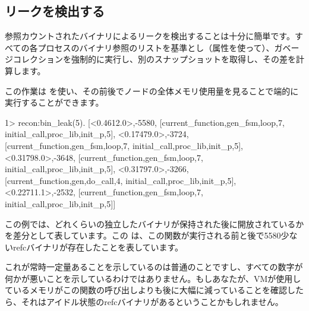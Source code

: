 \subsection{リークを検出する}

参照カウントされたバイナリによるリークを検出することは十分に簡単です。すべての各プロセスのバイナリ参照のリストを基準とし（属性を使って）、ガベージコレクションを強制的に実行し、別のスナップショットを取得し、その差を計算します。

この作業は  を使い、その前後でノードの全体メモリ使用量を見ることで端的に実行することができます。

\begin{VerbatimEshell}
1> recon:bin_leak(5).
[{<0.4612.0>,-5580,
  [{current_function,{gen_fsm,loop,7}},
   {initial_call,{proc_lib,init_p,5}}]},
 {<0.17479.0>,-3724,
  [{current_function,{gen_fsm,loop,7}},
   {initial_call,{proc_lib,init_p,5}}]},
 {<0.31798.0>,-3648,
  [{current_function,{gen_fsm,loop,7}},
   {initial_call,{proc_lib,init_p,5}}]},
 {<0.31797.0>,-3266,
  [{current_function,{gen,do_call,4}},
   {initial_call,{proc_lib,init_p,5}}]},
 {<0.22711.1>,-2532,
  [{current_function,{gen_fsm,loop,7}},
   {initial_call,{proc_lib,init_p,5}}]}]
\end{VerbatimEshell}

この例では、どれくらいの独立したバイナリが保持された後に開放されているかを差分として表しています。この  は、この関数が実行される前と後で5580少ないrefcバイナリが存在したことを表しています。

これが常時一定量あることを示しているのは普通のことですし、すべての数字が何かが悪いことを示しているわけではありません。もしあなたが、VMが使用しているメモリがこの関数の呼び出しよりも後に大幅に減っていることを確認したら、それはアイドル状態のrefcバイナリがあるということかもしれません。

